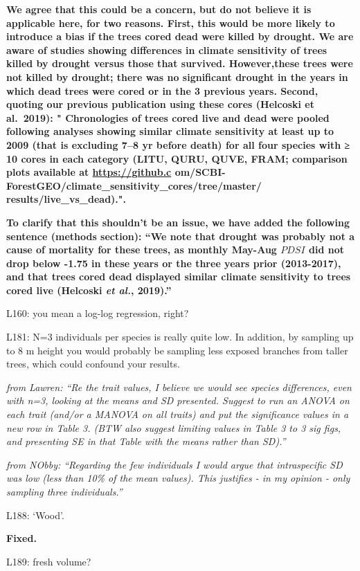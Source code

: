 \documentclass[
]{article}
\begin{document}
\textbf{We agree that this could be a concern, but do not believe it is
applicable here, for two reasons. First, this would be more likely to
introduce a bias if the trees cored dead were killed by drought. We are
aware of studies showing differences in climate sensitivity of trees
killed by drought versus those that survived. However,these trees were
not killed by drought; there was no significant drought in the years in
which dead trees were cored or in the 3 previous years. Second, quoting
our previous publication using these cores (Helcoski et al.~2019): "
Chronologies of trees cored live and dead were pooled following analyses
showing similar climate sensitivity at least up to 2009 (that is
excluding 7--8 yr before death) for all four species with ≥ 10 cores in
each category (LITU, QURU, QUVE, FRAM; comparison plots available at
\url{https://github.c}
om/SCBI-ForestGEO/climate\_sensitivity\_cores/tree/master/
results/live\_vs\_dead).".}

\textbf{To clarify that this shouldn't be an issue, we have added the
following sentence (methods section): ``We note that drought was
probably not a cause of mortality for these trees, as monthly May-Aug
\(PDSI\) did not drop below -1.75 in these years or the three years
prior (2013-2017), and that trees cored dead displayed similar climate
sensitivity to trees cored live (Helcoski \emph{et al.}, 2019).''}

L160: you mean a log-log regression, right?

L181: N=3 individuals per species is really quite low. In addition, by
sampling up to 8 m height you would probably be sampling less exposed
branches from taller trees, which could confound your results.

\emph{from Lawren: ``Re the trait values, I believe we would see species
differences, even with n=3, looking at the means and SD presented.
Suggest to run an ANOVA on each trait (and/or a MANOVA on all traits)
and put the significance values in a new row in Table 3. (BTW also
suggest limiting values in Table 3 to 3 sig figs, and presenting SE in
that Table with the means rather than SD).''}

\emph{from NObby: ``Regarding the few individuals I would argue that
intraspecific SD was low (less than 10\% of the mean values). This
justifies - in my opinion - only sampling three individuals.''}

L188: `Wood'.

\textbf{Fixed.}

L189: fresh volume?
\end{document}
